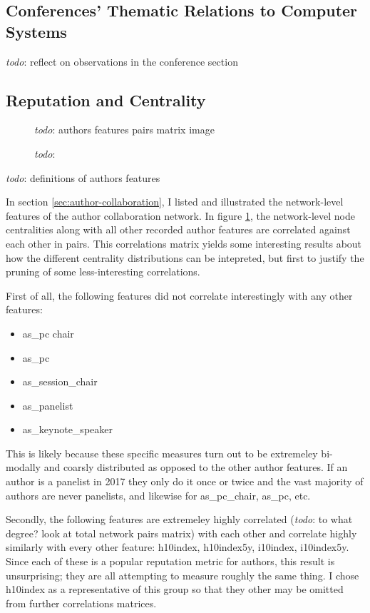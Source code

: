\documentclass{article}
\newcommand{\todoblock}[1]{\noindent\textit{todo}: #1}
\newcommand{\todo}[1]{\textit{todo}: #1}
\begin{document}
\subsection{Conferences' Thematic Relations to Computer Systems}

\todo{reflect on observations in the conference section}

\subsection{Reputation and Centrality}

\begin{figure}[h!]
  \centering
  \todoblock{authors features pairs matrix image}
  \caption{\todo{}}
  \label{fig:authors-feature-pairs-matrix}
\end{figure}

\todoblock{definitions of authors features}

In section \ref{sec:author-collaboration}, I listed and illustrated the network-level features of the author collaboration network.
In figure \ref{fig:authors-feature-pairs-matrix}, the network-level node centralities along with all other recorded author features are correlated against each other in pairs.
This correlations matrix yields some interesting results about how the different centrality distributions can be intepreted, but first to justify the pruning of some less-interesting correlations.

First of all, the following features did not correlate interestingly with any other features:
\begin{itemize}
\item as\_pc chair
\item as\_pc
\item as\_session\_chair
\item as\_panelist
\item as\_keynote\_speaker
\end{itemize}
This is likely because these specific measures turn out to be extremeley bi-modally and coarsly distributed as opposed to the other author features.
If an author is a panelist in 2017 they only do it once or twice and the vast majority of authors are never panelists, and likewise for as\_pc\_chair, as\_pc, etc.

Secondly, the following features are extremeley highly correlated (\todo{to what degree? look at total network pairs matrix}) with each other and correlate highly similarly with every other feature: h10index, h10index5y, i10index, i10index5y.
Since each of these is a popular reputation metric for authors, this result is unsurprising; they are all attempting to measure roughly the same thing.
I chose h10index as a representative of this group so that they other may be omitted from further correlations matrices.
\end{document}
